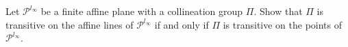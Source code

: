 Let $\mathcal{P}^{l_{\infty}}$ be a finite affine plane with a collineation group $\Pi$. Show that $\Pi$ is transitive on the affine lines of $\mathcal{P}^{l_{\infty}}$ if and only if $\Pi$ is transitive on the points of $\mathcal{P}^{l_{\infty}}$.
